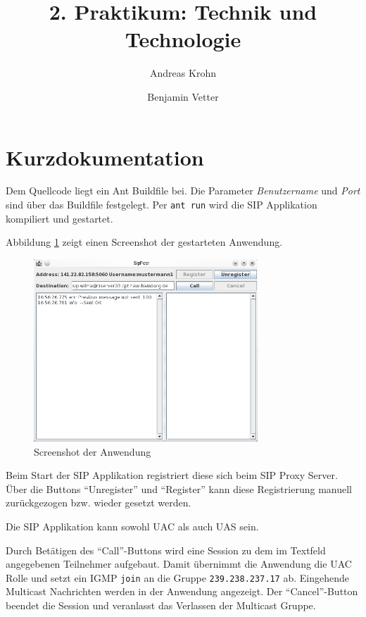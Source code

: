 \documentclass[a4paper,10pt]{article}
\title{2. Praktikum: Technik und Technologie}
\author{Andreas Krohn \and Benjamin Vetter}
\begin{document}
\maketitle

\section{Kurzdokumentation}

Dem Quellcode liegt ein Ant Buildfile bei. 
Die Parameter \emph{Benutzername} und \emph{Port} sind über das Buildfile festgelegt.
Per \verb=ant run= wird die SIP Applikation kompiliert und gestartet.

Abbildung \ref{screenshot} zeigt einen Screenshot der gestarteten Anwendung. 

\begin{figure}[h]
	\begin{center}
		\includegraphics[width=0.75\textwidth]{screenshot_SipPeer.png}
	\end{center}

	\caption{Screenshot der Anwendung}

	\label{screenshot}
\end{figure}


Beim Start der SIP Applikation registriert diese sich beim SIP Proxy Server. Über die Buttons "`Unregister"' und "`Register"' kann diese Registrierung manuell zurückgezogen bzw. wieder gesetzt werden.

Die SIP Applikation kann sowohl UAC als auch UAS sein. 

Durch Betätigen des "`Call"'-Buttons wird eine Session zu dem im Textfeld angegebenen Teilnehmer aufgebaut. Damit übernimmt die Anwendung die UAC Rolle und setzt ein IGMP \verb=join= an die Gruppe \verb=239.238.237.17= ab. Eingehende Multicast Nachrichten werden in der Anwendung angezeigt. Der "`Cancel"'-Button beendet die Session und veranlasst das Verlassen der Multicast Gruppe.
\end{document}
